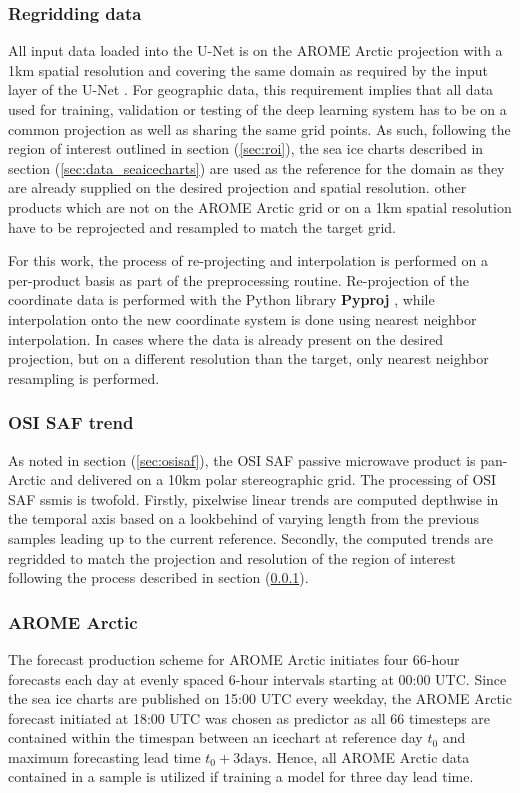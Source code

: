 \documentclass[../main/thesis]{subfiles}
\begin{document}
\subsubsection{Regridding data}
\label{sec:regrid}
All input data loaded into the U-Net is on the AROME Arctic projection \citep{Mueller2017} with a 1km spatial resolution and covering the same domain as required by the input layer of the U-Net \citep{Ronneberger2015}. For geographic data, this requirement implies that all data used for training, validation or testing of the deep learning system has to be on a common projection as well as sharing the same grid points. As such, following the region of interest outlined in section (\ref{sec:roi}), the sea ice charts described in section (\ref{sec:data_seaicecharts}) are used as the reference for the domain as they are already supplied on the desired projection and spatial resolution. other products which are not on the AROME Arctic grid \citep{Mueller2017} or on a 1km spatial resolution \citep{Dinessen2020} have to be reprojected and resampled to match the target grid.

For this work, the process of re-projecting and interpolation is performed on a per-product basis as part of the preprocessing routine. Re-projection of the coordinate data is performed with the Python library \textbf{Pyproj} \citep{Snow2022}, while interpolation onto the new coordinate system is done using nearest neighbor interpolation. In cases where the data is already present on the desired projection, but on a different resolution than the target, only nearest neighbor resampling is performed.

\subsubsection{OSI SAF trend}
As noted in section (\ref{sec:osisaf}), the OSI SAF passive microwave product is pan-Arctic and delivered on a 10km polar stereographic grid. The processing of OSI SAF ssmis is twofold. Firstly, pixelwise linear trends are computed depthwise in the temporal axis based on a lookbehind of varying length from the previous samples leading up to the current reference. Secondly, the computed trends are regridded to match the projection and resolution of the region of interest following the process described in section (\ref{sec:regrid}).

\subsubsection{AROME Arctic}
The forecast production scheme for AROME Arctic initiates four 66-hour forecasts each day at evenly spaced 6-hour intervals starting at 00:00 UTC. Since the sea ice charts are published on 15:00 UTC every weekday, the AROME Arctic forecast initiated at 18:00 UTC was chosen as predictor as all 66 timesteps are contained within the timespan between an icechart at reference day $t_0$ and maximum forecasting lead time $t_0 + 3 \text{days}$. Hence, all AROME Arctic data contained in a sample is utilized if training a model for three day lead time.
\end{document}
